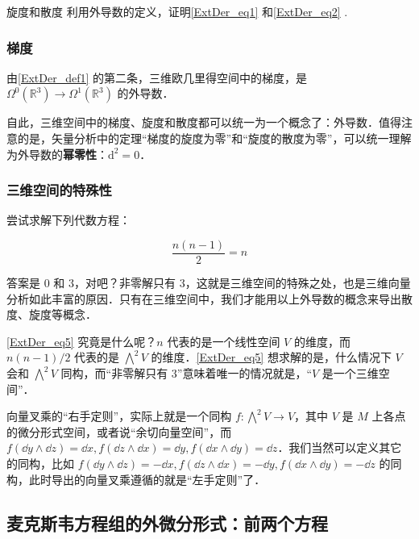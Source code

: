 \begin{exercise}{旋度和散度}
利用外导数的定义，证明\autoref{ExtDer_eq1} 和\autoref{ExtDer_eq2} .
\end{exercise}

\subsubsection{梯度}

由\autoref{ExtDer_def1} 的第二条，三维欧几里得空间中的梯度，是 $\Omega^0(\mathbb{R}^3)\rightarrow\Omega^1(\mathbb{R}^3)$ 的外导数．

自此，三维空间中的梯度、旋度和散度都可以统一为一个概念了：外导数．值得注意的是，矢量分析中的定理“梯度的旋度为零”和“旋度的散度为零”，可以统一理解为外导数的\textbf{幂零性}：$\mathrm{d}^2=0$．

\subsubsection{三维空间的特殊性}

尝试求解下列代数方程：

\begin{equation}\label{ExtDer_eq5}
\frac{n(n-1)}{2}=n
\end{equation}

答案是 $0$ 和 $3$，对吧？非零解只有 $3$，这就是三维空间的特殊之处，也是三维向量分析如此丰富的原因．只有在三维空间中，我们才能用以上外导数的概念来导出散度、旋度等概念．

\autoref{ExtDer_eq5} 究竟是什么呢？$n$ 代表的是一个线性空间 $V$ 的维度，而 $n(n-1)/2$ 代表的是 $\bigwedge^2 V$ 的维度．\autoref{ExtDer_eq5} 想求解的是，什么情况下 $V$ 会和 $\bigwedge^2 V$ 同构，而“非零解只有 $3$”意味着唯一的情况就是，“$V$ 是一个三维空间”．

向量叉乘的“右手定则”，实际上就是一个同构 $f:\bigwedge^2 V\to V$，其中 $V$ 是 $M$ 上各点的微分形式空间，或者说“余切向量空间”，而 $f(\dd y\wedge \dd z)=\dd x, f(\dd z\wedge \dd x)=\dd y, f(\dd x\wedge \dd y)=\dd z$．我们当然可以定义其它的同构，比如 $f(\dd y\wedge \dd z)=-\dd x, f(\dd z\wedge \dd x)=-\dd y, f(\dd x\wedge \dd y)=-\dd z$ 的同构，此时导出的向量叉乘遵循的就是“左手定则”了．



\subsection{麦克斯韦方程组的外微分形式：前两个方程}



